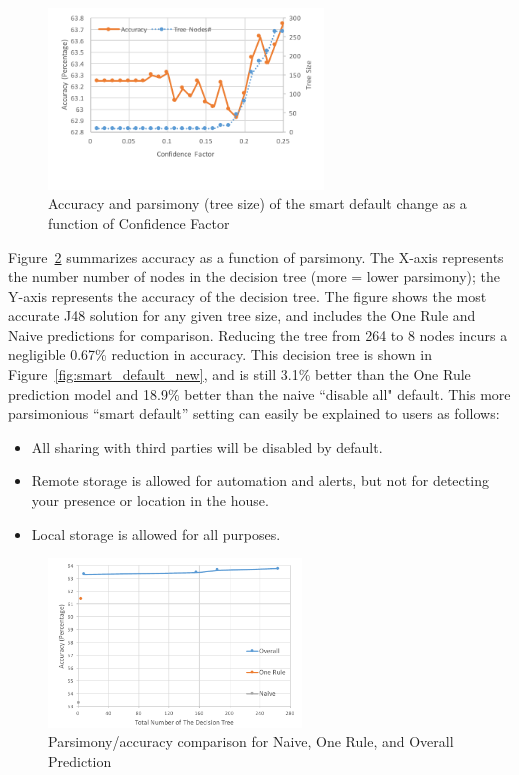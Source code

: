 \begin{figure}
	\centering
	\includegraphics[width=0.65\textwidth]{figures/smart_default_cf.pdf}
	\caption{Accuracy and parsimony (tree size) of the smart default change as a function of Confidence Factor}
	\label{fig:smart_default_cf}
\end{figure}

Figure~\ref{fig:smart_default_optimal} summarizes accuracy as a function of parsimony. The X-axis represents the number number of nodes in the decision tree (more = lower parsimony); the Y-axis represents the accuracy of the decision tree. The figure shows the most accurate J48 solution for any given tree size, and includes the One Rule and Naive predictions for comparison. Reducing the tree from 264 to 8 nodes incurs a negligible 0.67\% reduction in accuracy. This decision tree is shown in Figure~\ref{fig:smart_default_new}, and is still 3.1\% better than the One Rule prediction model and 18.9\% better than the naive ``disable all" default. This more parsimonious ``smart default'' setting  can easily be explained to users as follows: 
\begin{itemize}
	\item All sharing with third parties will be disabled by default. 
	\item Remote storage is allowed for automation and alerts, but not for detecting your presence or location in the house. 
	\item Local storage is allowed for all purposes.
\end{itemize}


\begin{figure}
	\centering
	\includegraphics[width=0.6\textwidth]{figures/smart_default_optimal.pdf}
	\caption{Parsimony/accuracy comparison for Naive, One Rule, and Overall Prediction}
	\label{fig:smart_default_optimal}
\end{figure}


